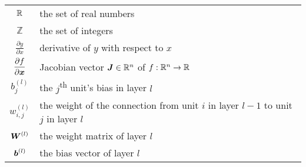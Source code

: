 \documentclass[../report.tex]{subfiles}
\begin{document}
\begin{tabular}{cl}
    $\displaystyle \mathbb{R}$ & the set of real numbers\\
    $\displaystyle \mathbb{Z}$ & the set of integers\\
    $\displaystyle \frac{\partial y}{\partial x}$ & derivative of $y$ with respect to $x$\\
    $\displaystyle \frac{\partial f}{\partial {\bm{x}}}$ & Jacobian vector ${\bm{J}}\in \mathbb{R}^n$ of $f:\mathbb{R}^n\to\mathbb{R}$\\
    $\displaystyle b_j^{(l)}$ & the $j$\textsuperscript{th} unit's bias in layer $l$\\
    $\displaystyle w_{i,j}^{(l)}$ & the weight of the connection from unit $i$ in layer $l-1$ to unit $j$ in layer $l$\\
    $\displaystyle {\bm{W}}^{(l)}$ & the weight matrix of layer $l$\\
    $\displaystyle {\bm{b}}^{(l)}$ & the bias vector of layer $l$
\end{tabular}
\end{document}
